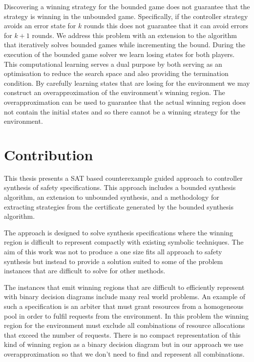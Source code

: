 Discovering a winning strategy for the bounded game does not guarantee that the strategy is winning in the unbounded game. Specifically, if the controller strategy avoids an error state for $k$ rounds this does not guarantee that it can avoid errors for $k+1$ rounds. We address this problem with an extension to the algorithm that iteratively solves bounded games while incrementing the bound. During the execution of the bounded game solver we learn losing states for both players. This computational learning serves a dual purpose by both serving as an optimisation to reduce the search space and also providing the termination condition. By carefully learning states that are losing for the environment we may construct an overapproximation of the environment's winning region. The overapproximation can be used to guarantee that the actual winning region does not contain the initial states and so there cannot be a winning strategy for the environment.


\section{Contribution}

This thesis presents a SAT based counterexample guided approach to controller synthesis of safety specifications. This approach includes a bounded synthesis algorithm, an extension to unbounded synthesis, and a methodology for extracting strategies from the certificate generated by the bounded synthesis algorithm. 

The approach is designed to solve synthesis specifications where the winning region is difficult to represent compactly with existing symbolic techniques. The aim of this work was not to produce a one size fits all approach to safety synthesis but instead to provide a solution suited to some of the problem instances that are difficult to solve for other methods.

The instances that emit winning regions that are difficult to efficiently represent with binary decision diagrams include many real world problems. An example of such a specification is an arbiter that must grant resources from a homogeneous pool in order to fulfil requests from the environment. In this problem the winning region for the environment must exclude all combinations of resource allocations that exceed the number of requests. There is no compact representation of this kind of winning region as a binary decision diagram but in our approach we use overapproximation so that we don't need to find and represent all combinations.

